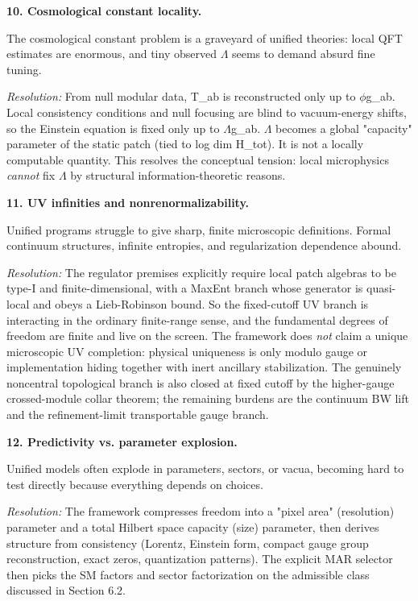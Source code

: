\textbf{10. Cosmological constant locality.}

The cosmological constant problem is a graveyard of unified theories: local QFT estimates are enormous, and tiny observed \ensuremath{\Lambda} seems to demand absurd fine tuning.

\emph{Resolution:} From null modular data, T\_ab is reconstructed only up to \ensuremath{\phi}g\_ab. Local consistency conditions and null focusing are blind to vacuum-energy shifts, so the Einstein equation is fixed only up to \ensuremath{\Lambda}g\_ab. \ensuremath{\Lambda} becomes a global "capacity" parameter of the static patch (tied to log dim H\_tot). It is not a locally computable quantity. This resolves the conceptual tension: local microphysics \emph{cannot} fix \ensuremath{\Lambda} by structural information-theoretic reasons.

\textbf{11. UV infinities and nonrenormalizability.}

Unified programs struggle to give sharp, finite microscopic definitions. Formal continuum structures, infinite entropies, and regularization dependence abound.

\emph{Resolution:} The regulator premises explicitly require local patch algebras to be type-I and finite-dimensional, with a MaxEnt branch whose generator is quasi-local and obeys a Lieb-Robinson bound. So the fixed-cutoff UV branch is interacting in the ordinary finite-range sense, and the fundamental degrees of freedom are finite and live on the screen. The framework does \emph{not} claim a unique microscopic UV completion: physical uniqueness is only modulo gauge or implementation hiding together with inert ancillary stabilization. The genuinely noncentral topological branch is also closed at fixed cutoff by the higher-gauge crossed-module collar theorem; the remaining burdens are the continuum BW lift and the refinement-limit transportable gauge branch.

\textbf{12. Predictivity vs. parameter explosion.}

Unified models often explode in parameters, sectors, or vacua, becoming hard to test directly because everything depends on choices.

\emph{Resolution:} The framework compresses freedom into a "pixel area" (resolution) parameter and a total Hilbert space capacity (size) parameter, then derives structure from consistency (Lorentz, Einstein form, compact gauge group reconstruction, exact zeros, quantization patterns). The explicit MAR selector then picks the SM factors and sector factorization on the admissible class discussed in Section 6.2.

